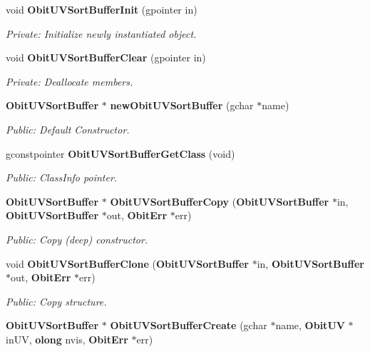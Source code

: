 \begin{CompactItemize}
\item 
void {\bf Obit\-UVSort\-Buffer\-Init} (gpointer in)
\begin{CompactList}\small\item\em Private: Initialize newly instantiated object. \item\end{CompactList}\item 
void {\bf Obit\-UVSort\-Buffer\-Clear} (gpointer in)
\begin{CompactList}\small\item\em Private: Deallocate members. \item\end{CompactList}\item 
{\bf Obit\-UVSort\-Buffer} $\ast$ {\bf new\-Obit\-UVSort\-Buffer} (gchar $\ast$name)
\begin{CompactList}\small\item\em Public: Default Constructor. \item\end{CompactList}\item 
gconstpointer {\bf Obit\-UVSort\-Buffer\-Get\-Class} (void)
\begin{CompactList}\small\item\em Public: Class\-Info pointer. \item\end{CompactList}\item 
{\bf Obit\-UVSort\-Buffer} $\ast$ {\bf Obit\-UVSort\-Buffer\-Copy} ({\bf Obit\-UVSort\-Buffer} $\ast$in, {\bf Obit\-UVSort\-Buffer} $\ast$out, {\bf Obit\-Err} $\ast$err)
\begin{CompactList}\small\item\em Public: Copy (deep) constructor. \item\end{CompactList}\item 
void {\bf Obit\-UVSort\-Buffer\-Clone} ({\bf Obit\-UVSort\-Buffer} $\ast$in, {\bf Obit\-UVSort\-Buffer} $\ast$out, {\bf Obit\-Err} $\ast$err)
\begin{CompactList}\small\item\em Public: Copy structure. \item\end{CompactList}\item 
{\bf Obit\-UVSort\-Buffer} $\ast$ {\bf Obit\-UVSort\-Buffer\-Create} (gchar $\ast$name, {\bf Obit\-UV} $\ast$in\-UV, {\bf olong} nvis, {\bf Obit\-Err} $\ast$err)

\end{CompactItemize}
